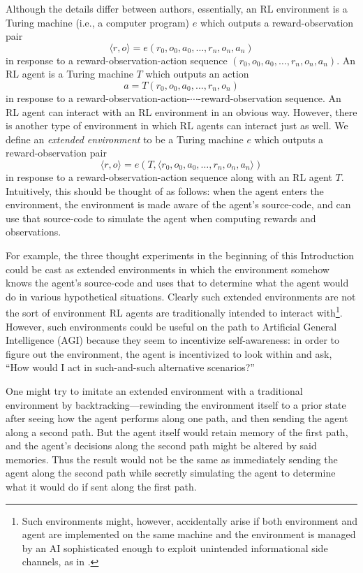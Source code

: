 \documentclass[runningheads]{llncs}
\begin{document}
Although the details differ between authors, essentially,
an RL environment is a Turing machine (i.e., a computer program)
$e$ which outputs a reward-observation pair
\[
  \langle r,o\rangle=e(r_0,o_0,a_0,\ldots,r_n,o_n,a_n)
\]
in response to a
reward-observation-action sequence $(r_0,o_0,a_0,\ldots,r_n,o_n,a_n)$.
An RL agent is a Turing machine $T$ which outputs an action
\[
  a=T(r_0,o_0,a_0,\ldots,r_n,o_n)
\]
in response to a
reward-observation-action-$\cdots$-reward-observation sequence.
An RL agent can interact with an RL environment in an obvious way.
However, there is another type of environment in which
RL agents can interact just as well. We define an \emph{extended
environment} to be a Turing machine $e$ which outputs a reward-observation pair
\[
    \langle r,o\rangle=e(T,\langle r_0,o_0,a_0,\ldots,r_n,o_n,a_n \rangle)
\]
in response
to a reward-observation-action sequence
along with an RL agent $T$.
Intuitively, this should be thought of as follows: when the agent enters the environment,
the environment is made aware of the agent's source-code, and can use that
source-code to simulate the agent when computing rewards and observations.

For example, the three thought experiments in the beginning of this Introduction could
be cast as extended environments in which the environment somehow knows the agent's
source-code and uses that to determine what the agent would do in various
hypothetical situations.
Clearly such
extended environments are not the sort of environment RL agents are traditionally
intended to interact with\footnote{Such environments might, however,
accidentally arise if both environment
and agent are implemented on the same machine and the environment is managed by an AI
sophisticated enough to exploit unintended informational side channels, as in
\cite{yampolskiy2012leakproofing}.}. However, such environments could be
useful on the path to Artificial
General Intelligence (AGI) because they seem to incentivize self-awareness:
in order to figure out the environment, the agent is incentivized to look within
and ask, ``How would I act in such-and-such alternative scenarios?''

One might try to imitate an extended environment with a traditional environment by
backtracking---rewinding the environment itself to a prior state after seeing how the
agent performs along one path, and then sending the agent along a second path.
But the agent itself would retain memory of the first path, and the agent's decisions
along the second path might be altered by said memories. Thus the result would not be
the same as immediately sending the agent along the second path while secretly simulating
the agent to determine what it would do if sent along the first path.
\end{document}
